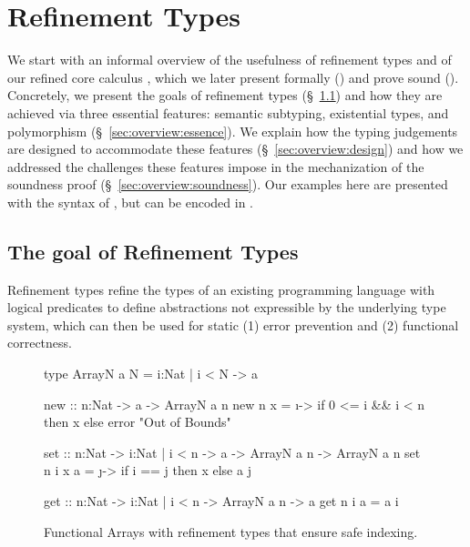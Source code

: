 \chapter{Refinement Types}
\label{ch:overview}
We start with an informal overview of
the usefulness of refinement types and of our
refined core calculus \sysrf,
which we later present formally ()
and prove sound ().
%
Concretely,
we present the goals of refinement types (\S~\ref{sec:overview:goal})
and how they are achieved via three essential features:
semantic subtyping, existential types, and polymorphism
(\S~\ref{sec:overview:essence}).
We explain how the typing judgements are designed to accommodate these features
(\S~\ref{sec:overview:design})
and how we addressed the challenges these features impose in the mechanization
of the soundness proof (\S~\ref{sec:overview:soundness}).
Our examples here are presented with the syntax of \lh,
but can be encoded in \sysrf.

\section{The goal of Refinement Types} 
\label{sec:overview:goal}

Refinement types refine the types of an existing programming language
with logical predicates to define abstractions not expressible by the
underlying type system, which can then be used for static
%
(1) error prevention and (2) functional correctness.


\begin{figure}[t]



\begin{code}
  type ArrayN a N = {i:Nat | i < N} -> a

  new :: n:Nat -> a -> ArrayN a n
  new n x = \i -> if 0 <= i && i < n then x else error "Out of Bounds"

  set :: n:Nat -> i:{Nat | i < n} -> a -> ArrayN a n -> ArrayN a n
  set n i x a = \j -> if i == j then x else a j

  get :: n:Nat -> i:{Nat | i < n} -> ArrayN a n -> a
  get n i a = a i
\end{code}
\vspace{0.0cm}
\caption{Functional Arrays with refinement types that ensure safe indexing.}
\vspace{0.0cm}
\label{fig:array}
\end{figure}


